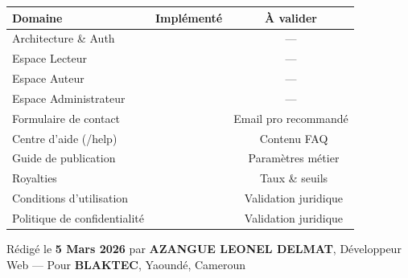 \documentclass[12pt,a4paper]{article}
\newcommand{\cmark}{\textcolor{Vert}{\ding{51}}}
\newcommand{\warn}{\textcolor{OrangeOCaLi}{\ding{115}}}
\begin{document}
\begin{center}
\begin{tabular}{lcc}
  \toprule
  \textbf{Domaine} & \textbf{Implémenté} & \textbf{À valider} \\
  \midrule
  Architecture \& Auth              & \cmark & — \\
  Espace Lecteur                    & \cmark & — \\
  Espace Auteur                     & \cmark & — \\
  Espace Administrateur             & \cmark & — \\
  Formulaire de contact             & \cmark & Email pro recommandé \\
  Centre d'aide (/help)             & \cmark & \warn\ Contenu FAQ \\
  Guide de publication              & \cmark & \warn\ Paramètres métier \\
  Royalties                         & \cmark & \warn\ Taux \& seuils \\
  Conditions d'utilisation          & \cmark & \warn\ Validation juridique \\
  Politique de confidentialité      & \cmark & \warn\ Validation juridique \\
  \bottomrule
\end{tabular}
\end{center}

\vspace{2em}
\begin{center}
  \textcolor{GrisFonce}{\small Rédigé le \textbf{5 Mars 2026} par \textbf{AZANGUE LEONEL DELMAT}, Développeur Web — Pour \textbf{BLAKTEC}, Yaoundé, Cameroun}
\end{center}
\end{document}
